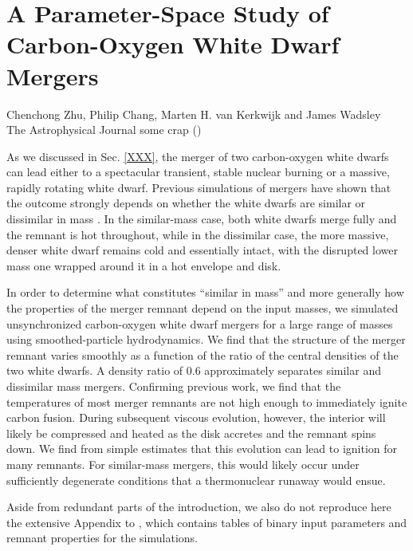 \chapter{A Parameter-Space Study of Carbon-Oxygen White Dwarf Mergers}
\label{ch:ch2}

\begin{center}
\begin{minipage}[c]{4.75in}
Chenchong Zhu, Philip Chang, Marten H. van Kerkwijk and James Wadsley\\
The Astrophysical Journal {\charles some crap} (\citeal{zhu+13})
\vspace{2em}
\end{minipage}
\end{center}

As we discussed in Sec. \ref{XXX}, the merger of two carbon-oxygen white dwarfs can lead either to a spectacular transient, stable nuclear burning or a massive, rapidly rotating white dwarf.  Previous simulations of mergers have shown that the outcome strongly depends on whether the white dwarfs are similar or dissimilar in mass \citep{loreig09}.  In the similar-mass case, both white dwarfs merge fully and the remnant is hot throughout, while in the dissimilar case, the more massive, denser white dwarf remains cold and essentially intact, with the disrupted lower mass one wrapped around it in a hot envelope and disk.

In order to determine what constitutes ``similar in mass'' and more generally how the properties of the merger remnant depend on the input masses, we simulated unsynchronized carbon-oxygen white dwarf mergers for a large range of masses using smoothed-particle hydrodynamics.  We find that the structure of the merger remnant varies smoothly as a function of the ratio of the central densities of the two white dwarfs.  A density ratio of 0.6 approximately separates similar and dissimilar mass mergers.  Confirming previous work, we find that the temperatures of most merger remnants are not high enough to immediately ignite carbon fusion.  During subsequent viscous evolution, however, the interior will likely be compressed and heated as the disk accretes and the remnant spins down.  We find from simple estimates that this evolution can lead to ignition for many remnants.  For similar-mass mergers, this would likely occur under sufficiently degenerate conditions that a thermonuclear runaway would ensue.

Aside from redundant parts of the introduction, we also do not reproduce here the extensive Appendix to \citeal{zhu+13}, which contains tables of binary input parameters and remnant properties for the simulations.
